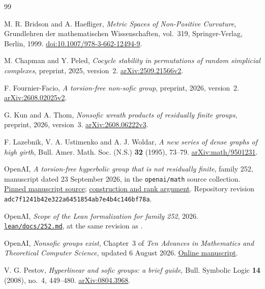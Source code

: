 \documentclass[11pt]{amsart}
\theoremstyle{definition}
\theoremstyle{remark}
\numberwithin{equation}{section}
\begin{document}
\begin{thebibliography}{99}

M. R. Bridson and A. Haefliger,
\emph{Metric Spaces of Non-Positive Curvature},
Grundlehren der mathematischen Wissenschaften, vol.~319,
Springer-Verlag, Berlin, 1999.
\href{https://doi.org/10.1007/978-3-662-12494-9}{doi:10.1007/978-3-662-12494-9}.

M. Chapman and Y. Peled,
\emph{Cocycle stability in permutations of random simplicial complexes},
preprint, 2025, version~2.
\href{https://arxiv.org/abs/2509.21566v2}{arXiv:2509.21566v2}.

F. Fournier-Facio,
\emph{A torsion-free non-sofic group},
preprint, 2026, version~2.
\href{https://arxiv.org/abs/2608.02025v2}{arXiv:2608.02025v2}.

G. Kun and A. Thom,
\emph{Nonsofic wreath products of residually finite groups},
preprint, 2026, version~3.
\href{https://arxiv.org/abs/2608.06222v3}{arXiv:2608.06222v3}.

F. Lazebnik, V. A. Ustimenko and A. J. Woldar,
\emph{A new series of dense graphs of high girth},
Bull. Amer. Math. Soc. (N.S.) \textbf{32} (1995), 73--79.
\href{https://arxiv.org/abs/math/9501231}{arXiv:math/9501231}.

OpenAI,
\emph{A torsion-free hyperbolic group that is not residually finite},
family 252, manuscript dated 23 September 2026, in the
\texttt{openai/math} source collection.
\href{https://github.com/openai/math/blob/adc7f1241b42e322a6451854ab7e4b4c146bf78a/preprints/a-torsion-free-hyperbolic-group-that-is-not-residually-finite-September-23-2026/build/paper.tex}{Pinned manuscript source};
\href{https://github.com/openai/math/blob/adc7f1241b42e322a6451854ab7e4b4c146bf78a/preprints/a-torsion-free-hyperbolic-group-that-is-not-residually-finite-September-23-2026/build/sections/construction.tex}{construction and rank argument}.
Repository revision \texttt{adc7f1241b42e322a6451854ab7e4b4c146bf78a}.

OpenAI,
\emph{Scope of the Lean formalization for family 252}, 2026.
\href{https://github.com/openai/math/blob/adc7f1241b42e322a6451854ab7e4b4c146bf78a/lean/docs/252.md}{\texttt{lean/docs/252.md}},
at the same revision as \cite{OA252}.

OpenAI,
\emph{Nonsofic groups exist},
Chapter~3 of \emph{Ten Advances in Mathematics and Theoretical
Computer Science}, updated 6 August 2026.
\href{https://cdn.openai.com/pdf/ten-proofs-oai.pdf}{Online manuscript}.

V. G. Pestov,
\emph{Hyperlinear and sofic groups: a brief guide},
Bull. Symbolic Logic \textbf{14} (2008), no.~4, 449--480.
\href{https://arxiv.org/abs/0804.3968}{arXiv:0804.3968}.

\end{thebibliography}
\end{document}
